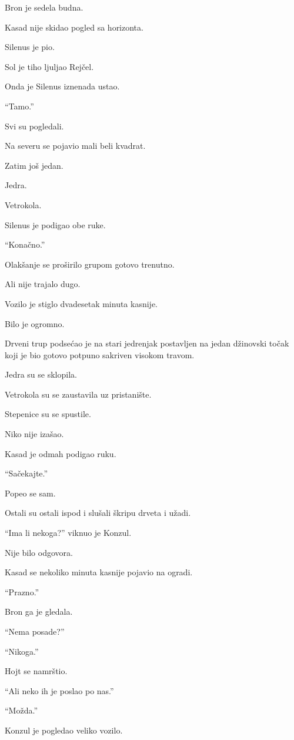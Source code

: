 Bron je sedela budna.

Kasad nije skidao pogled sa horizonta.

Silenus je pio.

Sol je tiho ljuljao Rejčel.

Onda je Silenus iznenada ustao.

``Tamo.''

Svi su pogledali.

Na severu se pojavio mali beli kvadrat.

Zatim još jedan.

Jedra.

Vetrokola.

Silenus je podigao obe ruke.

``Konačno.''

Olakšanje se proširilo grupom gotovo trenutno.

Ali nije trajalo dugo.

\bigskip

Vozilo je stiglo dvadesetak minuta kasnije.

Bilo je ogromno.

Drveni trup podsećao je na stari jedrenjak postavljen na jedan džinovski točak koji je bio gotovo potpuno sakriven visokom travom.

Jedra su se sklopila.

Vetrokola su se zaustavila uz pristanište.

Stepenice su se spustile.

Niko nije izašao.

Kasad je odmah podigao ruku.

``Sačekajte.''

Popeo se sam.

Ostali su ostali ispod i slušali škripu drveta i užadi.

``Ima li nekoga?'' viknuo je Konzul.

Nije bilo odgovora.

Kasad se nekoliko minuta kasnije pojavio na ogradi.

``Prazno.''

Bron ga je gledala.

``Nema posade?''

``Nikoga.''

Hojt se namrštio.

``Ali neko ih je poslao po nas.''

``Možda.''

Konzul je pogledao veliko vozilo.

